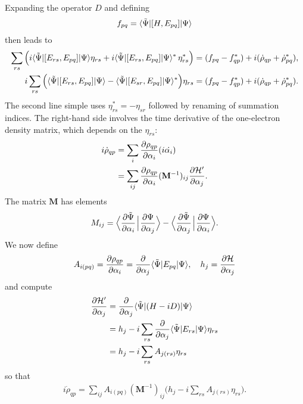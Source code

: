 \documentclass[aip,jcp,preprint,superscriptaddress,nofootinbib]{revtex4-1}
\begin{document}
Expanding the operator $D$ and defining
\begin{align}
    f_{pq} = \langle \tilde{\Psi} \vert [H, E_{pq}] \vert \Psi \rangle
\end{align}
then leads to
\begin{align}
    \sum_{rs} \Big(
        i\langle \tilde{\Psi} \vert [E_{rs}, E_{pq}] \vert \Psi \rangle     \eta_{rs}
       +i\langle \tilde{\Psi} \vert [E_{rs}, E_{pq}] \vert \Psi \rangle^* \,\eta_{rs}^*
    \Big)
    = 
    (f_{pq} - f_{qp}^*) + i (\dot{\rho}_{qp} + \dot{\rho}_{pq}^*), \\
    i \sum_{rs} \Big(
        \langle \tilde{\Psi} \vert [E_{rs}, E_{pq}] \vert \Psi \rangle 
    -   \langle \tilde{\Psi} \vert [E_{sr}, E_{pq}] \vert \Psi \rangle^*
    \Big) \eta_{rs}
    = 
    (f_{pq} - f_{qp}^*) + i (\dot{\rho}_{qp} + \dot{\rho}_{pq}^*).
\end{align}
The second line simple uses $\eta_{rs}^* = -\eta_{sr}$ followed by renaming of summation indices.
The right-hand side involves the time derivative of the one-electron density matrix,
which depends on the $\eta_{rs}$:
\begin{align}
    i\dot{\rho}_{qp} 
    &= \sum_{i}  {\pdv{\rho_{qp}}{\alpha_i}} (i\dot{\alpha_i}) \nonumber\\
    &= \sum_{ij} {\pdv{\rho_{qp}}{\alpha_i}} (\mathbf{M}^{-1})_{ij} \pdv{\mathcal{H}'}{\alpha_j}.
\end{align}
The matrix $\mathbf{M}$ has elements
\begin{align}
    M_{ij} = \Big\langle \pdv{\tilde{\Psi}}{\alpha_i} \mspace{2mu} \Big\vert \mspace{1.5mu} \pdv{\Psi}{\alpha_j} \Big\rangle
    - \Big\langle \pdv{\tilde{\Psi}}{\alpha_j} \mspace{2mu} \Big\vert \mspace{1.5mu} \pdv{\Psi}{\alpha_i} \Big\rangle.
\end{align}
We now define
\begin{align}
    A_{i(pq)} = {\pdv{\rho_{qp}}{\alpha_i}} = \pdv{}{\alpha_j}  \langle \tilde{\Psi} \vert E_{pq} \vert \Psi \rangle, \quad
    h_j = \pdv{\mathcal{H}}{\alpha_j}
\end{align}
and compute
\begin{align}
    \pdv{\mathcal{H}'}{\alpha_j} 
    &= \pdv{}{\alpha_j} \langle \tilde{\Psi} \vert (H - iD) \vert \Psi \rangle  \nonumber\\
    &= h_j - i \sum_{rs} \pdv{}{\alpha_j}  \langle \tilde{\Psi} \vert E_{rs} \vert \Psi \rangle \eta_{rs} \nonumber\\
    &= h_j - i \sum_{rs} A_{j(rs)} \eta_{rs}
\end{align}
so that
\begin{align}
    i\dot{\rho}_{qp} = \sum_{ij}
    A_{i(pq)} (\mathbf{M}^{-1})_{ij}
    \Big(
        h_j - i \sum_{rs} A_{j(rs)} \eta_{rs}
    \Big).
\end{align}
\end{document}
